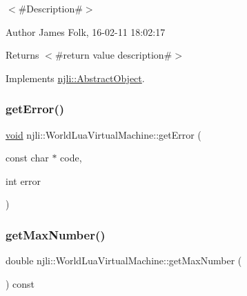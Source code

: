 $<$\#\+Description\#$>$ 

\begin{DoxyAuthor}{Author}
James Folk, 16-\/02-\/11 18\+:02\+:17
\end{DoxyAuthor}
\begin{DoxyReturn}{Returns}
$<$\#return value description\#$>$ 
\end{DoxyReturn}


Implements \mbox{\hyperlink{classnjli_1_1_abstract_object_afdabb48c4bf763e297ffe810b433a863}{njli\+::\+Abstract\+Object}}.

\mbox{\label{classnjli_1_1_world_lua_virtual_machine_a3656304f995527d8888ad13d98770108}} 
\subsubsection{\texorpdfstring{get\+Error()}{getError()}}
{\footnotesize\ttfamily \mbox{\hyperlink{_thread_8h_af1e856da2e658414cb2456cb6f7ebc66}{void}} njli\+::\+World\+Lua\+Virtual\+Machine\+::get\+Error (\begin{DoxyParamCaption}\item[{const char $\ast$}]{code,  }\item[{int}]{error }\end{DoxyParamCaption})\hspace{0.3cm}{\ttfamily [protected]}}

\mbox{\label{classnjli_1_1_world_lua_virtual_machine_aec42f43252d57dc00fa8a40ea18ebdfc}} 
\subsubsection{\texorpdfstring{get\+Max\+Number()}{getMaxNumber()}}
{\footnotesize\ttfamily double njli\+::\+World\+Lua\+Virtual\+Machine\+::get\+Max\+Number (\begin{DoxyParamCaption}{ }\end{DoxyParamCaption}) const}



